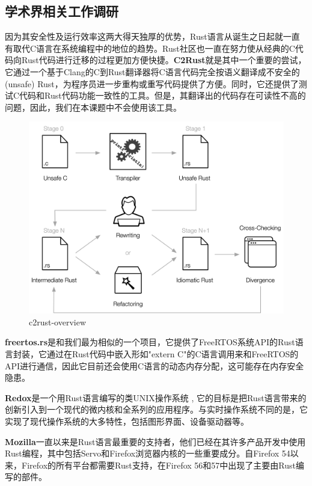 \documentclass[12pt, a4paper]{article}
\begin{document}
	
	\subsection{学术界相关工作调研}
	因为其安全性及运行效率这两大得天独厚的优势，Rust语言从诞生之日起就一直有取代C语言在系统编程中的地位的趋势。Rust社区也一直在努力使从经典的C代码向Rust代码进行迁移的过程更加方便快捷。\textbf{C2Rust}就是其中一个重要的尝试，它通过一个基于Clang的C到Rust翻译器将C语言代码完全按语义翻译成不安全的(unsafe) Rust，为程序员进一步重构或重写代码提供了方便。同时，它还提供了测试C代码和Rust代码功能一致性的工具。但是，其翻译出的代码存在可读性不高的问题，因此，我们在本课题中不会使用该工具。
	
\begin{figure}[H]
	\centering
	\includegraphics[width=1.0\linewidth]{c2rust-overview}
	\caption{c2rust-overview}
	\label{fig:c2rust-overview}
\end{figure}
	
	\textbf{freertos.rs}是和我们最为相似的一个项目，它提供了FreeRTOS系统API的Rust语言封装，它通过在Rust代码中嵌入形如"extern C"的C语言调用来和FreeRTOS的API进行通信，因此它目前还会使用C语言的动态内存分配，这可能存在内存安全隐患。
	
	\textbf{Redox}是一个用Rust语言编写的类UNIX操作系统 , 它的目标是把Rust语言带来的创新引入到一个现代的微内核和全系列的应用程序。与实时操作系统不同的是，它实现了现代操作系统的大多特性，包括图形界面、设备驱动器等。
	
	\textbf{Mozilla}一直以来是Rust语言最重要的支持者，他们已经在其许多产品开发中使用Rust编程，其中包括Servo和Firefox浏览器内核的一些重要成分。自Firefox 54以来，Firefox的所有平台都需要Rust支持，在Firefox 56和57中出现了主要由Rust编写的部件。
	
\end{document}
